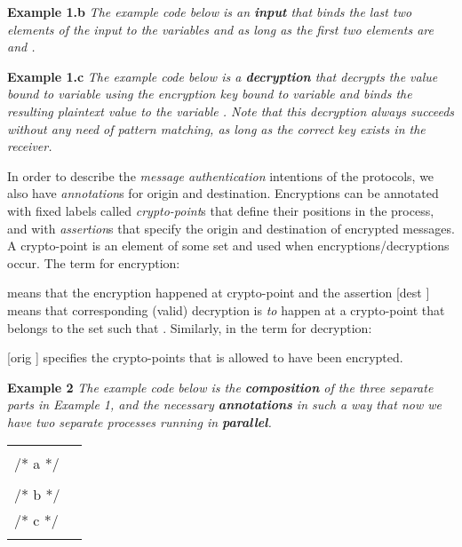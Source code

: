\textbf{Example 1.b}  \textit{The example \LYSA code below is an \textbf{input} that binds the last two elements of the input to the variables  and  as long as the first two elements are  and .}
\begin{center}\end{center} 

\textbf{Example 1.c}  \textit{The example \LYSA code below is a \textbf{decryption} that decrypts the value bound to variable  using the encryption key bound to variable  and binds the resulting plaintext value to the variable . Note that this decryption always succeeds without any need of pattern matching, as long as the correct key exists in the receiver.}
\begin{center}\end{center} 

In order to describe the \emph{message authentication} intentions of the protocols, we also have \emph{annotation}s for origin and destination.
Encryptions can be annotated with fixed labels called \textit{crypto-point}s that define their positions in the process, 
and with \textit{assertion}s that specify the origin and destination of encrypted messages.
A crypto-point  is an element of some set  and used when encryptions/decryptions occur. 
The \LYSA term for encryption:
\begin{center}  \end{center}
means that the encryption happened at crypto-point  and the assertion [dest ] means that 
corresponding (valid) decryption is \emph{to} happen at a crypto-point that belongs to the set  such that .
Similarly, in the \LYSA term for decryption:
\begin{center}  \end{center}
[orig ] specifies the crypto-points  that  is allowed to have been encrypted.

\textbf{Example 2}  \textit{The example \LYSA code below is the \textbf{composition} of the three separate parts in Example 1, and the necessary \textbf{annotations} in such a way that now we have two separate processes running in \textbf{parallel}.}

\begin{tabular}{ll}
         & \\
/* a */  &  \\
         &  \\
/* b */  &  \\
/* c */  &  \\
         & \\
\end{tabular}

